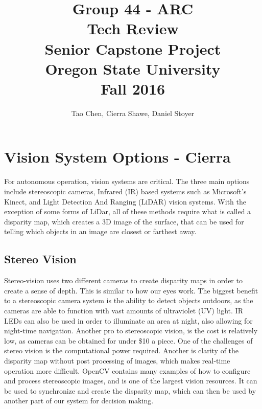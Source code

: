 \documentclass[compsoc,draftclsnofoot,onecolumn,10pt]{IEEEtran}
\begin{document}
\begin{titlepage}
\title{
Group 44 - ARC \\
Tech Review\\
\LARGE
Senior Capstone Project\\
Oregon State University\\
Fall 2016
}

\author{Tao Chen, Cierra Shawe, Daniel Stoyer}
\maketitle

\begin{abstract}

\end{abstract}

\thispagestyle{empty} %

\end{titlepage}
\newpage

\tableofcontents

\newpage

\section{Vision System Options - Cierra} %
For autonomous operation, vision systems are critical. 
The three main options include stereoscopic cameras, Infrared (IR) based systems such as Microsoft's Kinect, and Light Detection And Ranging (LiDAR) vision systems. 
With the exception of some forms of LiDar, all of these methods require what is called a disparity map, which creates a 3D image of the surface, that can be used for telling which objects in an image are closest or farthest away. 

\subsection{Stereo Vision}
Stereo-vision uses two different cameras to create disparity maps in order to create a sense of depth. 
This is similar to how our eyes work. 
The biggest benefit to a stereoscopic camera system is the ability to detect objects outdoors, as the cameras are able to function with vast amounts of ultraviolet (UV) light. 
IR LEDs can also be used in order to illuminate an area at night, also allowing for night-time navigation. 
Another pro to stereoscopic vision, is the cost is relatively low, as cameras can be obtained for under \$10 a piece.  
One of the challenges of stereo vision is the computational power required. 
Another is clarity of the disparity map without post processing of images, which makes real-time operation more difficult. 
\cite{acs}
OpenCV \cite{opencv} contains many examples of how to configure and process stereoscopic images, and is one of the largest vision resources. It can be used to synchronize and create the disparity map, which can then be used by another part of our system for decision making. 
\end{document}
